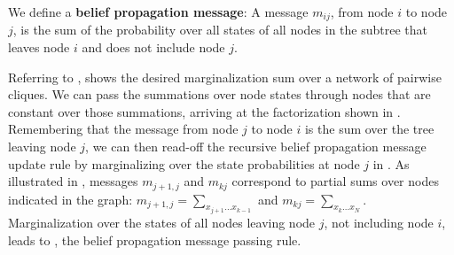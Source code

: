 We define a {\bf belief propagation message}:
A message $m_{ij}$, from node $i$ to node $j$, is the sum of the
 probability over all states of all
nodes in the subtree that leaves node $i$ and does not include node $j$.

Referring to , shows the desired
marginalization sum over a network of pairwise cliques.   
We can pass the summations over node states through nodes that are
constant over those summations, arriving at the factorization shown in
.  Remembering that the message from node $j$ to node $i$ is the sum
over the tree leaving node $j$, we can then read-off the recursive
belief propagation message update rule by marginalizing over the state probabilities at node $j$ in 
\fig{\ref{fig:bpmotivator2}}. As illustrated in \fig{\ref{fig:bpmotivator2}}, messages $m_{j+1,j}$ and $m_{kj}$ correspond to partial sums over nodes indicated in the graph: 
  $m_{j+1,j} = \sum_{x_{j+1} \ldots x_{k-1}}$ and 
  $m_{kj} = \sum_{x_k \ldots x_N}$.  Marginalization over the states of all nodes leaving node $j$, not including node $i$, leads to \eqn{\ref{eq:bpupdate}}, the belief propagation message passing rule.


